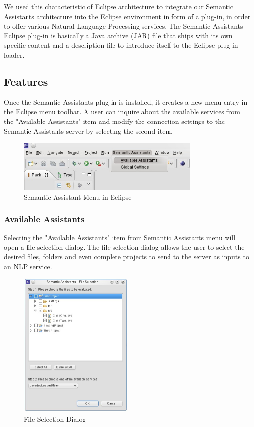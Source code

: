 We used this characteristic of Eclipse architecture to integrate our Semantic
Assistants architecture into the Eclipse environment in form of a plug-in, in
order to offer various Natural Language Processing services. The Semantic
Assistants Eclipse plug-in is basically a Java archive (JAR) file that ships
with its own specific content and a description file to introduce itself to the
Eclipse plug-in loader. 

\subsection{Features}
Once the Semantic Assistants plug-in is installed, it creates a new menu entry
in the Eclipse menu toolbar. A user can inquire about the available services
from the "Available Assistants" item and modify the connection settings to the
Semantic Assistants server by selecting the second item.
\begin{figure}[htb]
\begin{center}
  \includegraphics[width=0.8\textwidth]{pictures/eclipse_menu.jpg}
  \caption{Semantic Assistant Menu in Eclipse}
  \label{fig:eclipse_menu}
\end{center}
\end{figure}
\subsubsection{Available Assistants}
Selecting the "Available Assistants" item from Semantic Assistants menu will
open a file selection dialog. The file selection dialog allows the user to
select the desired files, folders and even complete projects to send to the
server as inputs to an NLP service.

\begin{figure}[htb]
\begin{center}
  \includegraphics[width=0.5\textwidth]{pictures/eclipse_fileSelection.jpg}
  \caption{File Selection Dialog}
  \label{fig:eclipse_fileSelection}
\end{center}
\end{figure}

